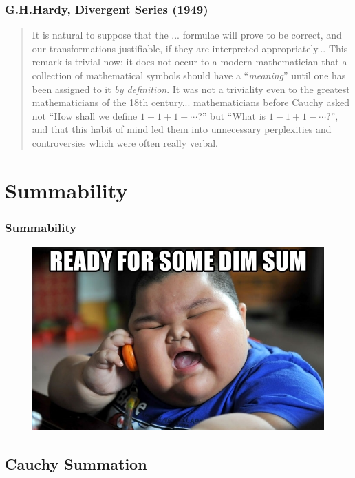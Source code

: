 \documentclass{beamer}
\begin{document}
\begin{frame}
\frametitle{G.H.Hardy, Divergent Series (1949)}

\begin{quote}
    It is natural to suppose that the ... formulae will prove to be correct, and our transformations justifiable, if they are interpreted appropriately... This remark is trivial now: it does not occur to a modern mathematician that a collection of mathematical symbols should have a ``\emph{meaning}'' until one has been assigned to it \emph{by definition}. It was not a triviality even to the greatest mathematicians of the 18th century... mathematicians before Cauchy asked not ``\alert{How shall we define} $ 1 - 1 + 1 - \cdots $?'' but ``\alert{What is} $ 1 - 1 + 1 - \cdots $?'', and that this habit of mind led them into unnecessary perplexities and controversies which were often really verbal. 
\end{quote}

\end{frame}


\section{Summability} 

\begin{frame}
\frametitle{Summability} 
\begin{figure}
\includegraphics[width=0.9\linewidth]{dim_sum.png}
\end{figure}
\end{frame}


\subsection{Cauchy Summation}
\end{document}
